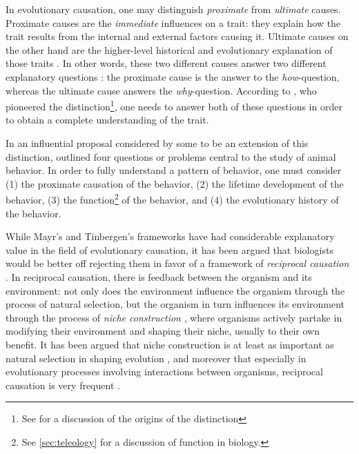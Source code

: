 In evolutionary causation, one may distinguish \emph{proximate} from \emph{ultimate} causes.
Proximate causes are the \emph{immediate} influences on a trait: they explain how the trait results from the internal and external factors causing it.
Ultimate causes on the other hand are the higher-level historical and evolutionary explanation of those traits \citep{Mayr61}. In other words, these two different causes answer two different explanatory questions : the proximate cause is the answer to the \emph{how}-question, whereas the ultimate cause answers the \emph{why}-question. According to \citet{Mayr61}, who pioneered the distinction\footnote{See \citep{Laland13} for a discussion of the origins of the distinction}, one needs to answer both of these questions in order to obtain a complete understanding of the trait.

In an influential proposal considered by some  to be an extension of this distinction, \citet{Tinbergen63} outlined four questions or problems central to the study of animal behavior. In order to fully understand a pattern of behavior, one must consider (1) the proximate causation of the behavior, (2) the lifetime development of the behavior, (3) the function\footnote{See \cref{sec:teleology} for a discussion of function in biology.} of the behavior, and (4) the evolutionary history of the behavior.

While Mayr's and Tinbergen's frameworks have had considerable explanatory value in the field of evolutionary causation, it has been argued that biologists would be better off rejecting them in favor of a framework of \emph{reciprocal causation} \citep{Laland13}.
In reciprocal causation, there is feedback between the organism and its environment: not only does the environment influence the organism through the process of natural selection, but the organism in turn influences its environment through the process of \emph{niche construction} \citep{Svensson18}, where organisms actively partake in modifying their environment and shaping their niche, usually to their own benefit. It has been argued that niche construction is at least as important as natural selection in shaping evolution , and moreover that especially in evolutionary processes involving interactions between organisms, reciprocal causation is very frequent \citep{Svensson18}.

